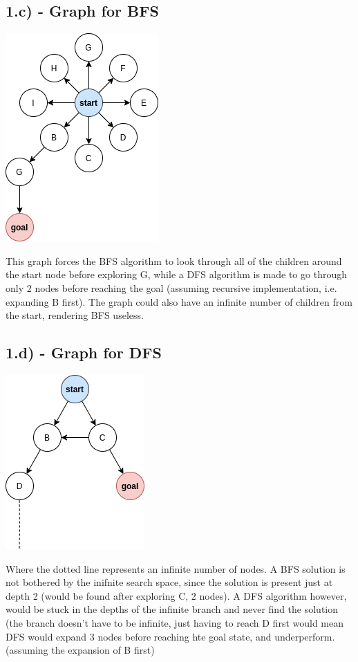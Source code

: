\documentclass{report}
\begin{document}
\subsection*{1.c) - Graph for BFS}
\begin{center}
    \includegraphics{Custom_Latex/Years/Year2/Semester2/R&A/CW1/Inf2D-Ass1-20/images/BFS.png}
\end{center}
This graph forces the BFS algorithm to look through all of the children around the start node before exploring G, while a DFS algorithm is made to go through only 2 nodes before reaching the goal (assuming recursive implementation, i.e. expanding B first). The graph could also have an infinite number of children from the start, rendering BFS useless.

\subsection*{1.d) - Graph for DFS}
\begin{center}
    \includegraphics{Custom_Latex/Years/Year2/Semester2/R&A/CW1/Inf2D-Ass1-20/images/DFS.png}
\end{center}
Where the dotted line represents an infinite number of nodes. A BFS solution is not bothered by the inifnite search space, since the solution is present just at depth 2 (would be found after exploring C, 2 nodes). A DFS algorithm however, would be stuck in the depths of the infinite branch and never find the solution (the branch doesn't have to be infinite, just having to reach D first would mean DFS would expand 3 nodes before reaching hte goal state, and underperform.
(assuming the expansion of B first)
\end{document}
